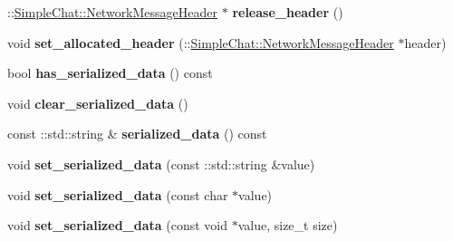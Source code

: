 \begin{DoxyCompactItemize}
\item 
\hypertarget{classSimpleChat_1_1NetworkMessage_ac75bcde248ca76cc4aa7f839247c304a}{\-::\hyperlink{classSimpleChat_1_1NetworkMessageHeader}{Simple\-Chat\-::\-Network\-Message\-Header} $\ast$ {\bfseries release\-\_\-header} ()}\label{classSimpleChat_1_1NetworkMessage_ac75bcde248ca76cc4aa7f839247c304a}

\item 
\hypertarget{classSimpleChat_1_1NetworkMessage_aa51b7ba1decb1797dfd093650ba08dad}{void {\bfseries set\-\_\-allocated\-\_\-header} (\-::\hyperlink{classSimpleChat_1_1NetworkMessageHeader}{Simple\-Chat\-::\-Network\-Message\-Header} $\ast$header)}\label{classSimpleChat_1_1NetworkMessage_aa51b7ba1decb1797dfd093650ba08dad}

\item 
\hypertarget{classSimpleChat_1_1NetworkMessage_a49bb324a3189bc0a0bb625b213271525}{bool {\bfseries has\-\_\-serialized\-\_\-data} () const }\label{classSimpleChat_1_1NetworkMessage_a49bb324a3189bc0a0bb625b213271525}

\item 
\hypertarget{classSimpleChat_1_1NetworkMessage_a72d633cac4a0124182d324b69580e87f}{void {\bfseries clear\-\_\-serialized\-\_\-data} ()}\label{classSimpleChat_1_1NetworkMessage_a72d633cac4a0124182d324b69580e87f}

\item 
\hypertarget{classSimpleChat_1_1NetworkMessage_a4e73beaedd4eaa119c980d4a9cb346d3}{const \-::std\-::string \& {\bfseries serialized\-\_\-data} () const }\label{classSimpleChat_1_1NetworkMessage_a4e73beaedd4eaa119c980d4a9cb346d3}

\item 
\hypertarget{classSimpleChat_1_1NetworkMessage_aa019206f91b409b2df833901ae5b7550}{void {\bfseries set\-\_\-serialized\-\_\-data} (const \-::std\-::string \&value)}\label{classSimpleChat_1_1NetworkMessage_aa019206f91b409b2df833901ae5b7550}

\item 
\hypertarget{classSimpleChat_1_1NetworkMessage_aef9c1f1afdf935e6195c07c99c0f2bdf}{void {\bfseries set\-\_\-serialized\-\_\-data} (const char $\ast$value)}\label{classSimpleChat_1_1NetworkMessage_aef9c1f1afdf935e6195c07c99c0f2bdf}

\item 
\hypertarget{classSimpleChat_1_1NetworkMessage_a8747f5041d73f390f233f6d31d21b1ae}{void {\bfseries set\-\_\-serialized\-\_\-data} (const void $\ast$value, size\-\_\-t size)}\label{classSimpleChat_1_1NetworkMessage_a8747f5041d73f390f233f6d31d21b1ae}


\end{DoxyCompactItemize}

